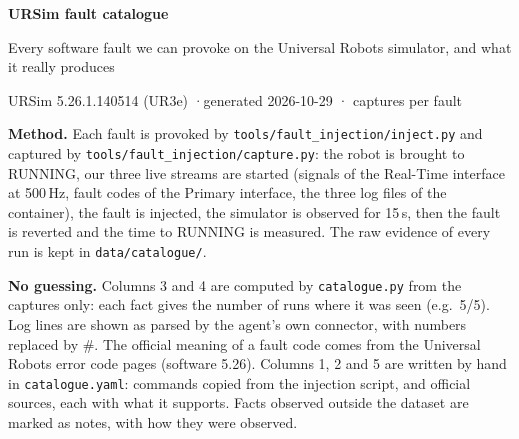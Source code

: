 \documentclass[10pt]{article}
\begin{document}
{\LARGE\bfseries\color{accent} URSim fault catalogue}\par
\vspace{2pt}
{\large Every software fault we can provoke on the Universal Robots simulator, and what it really produces}\par
\vspace{4pt}
URSim 5.26.1.140514 (UR3e) \quad·\quad generated 2026-10-29 \quad· captures per fault

\vspace{6pt}
\textbf{Method.} Each fault is provoked by \texttt{tools/fault\_injection/inject.py} and captured by
\texttt{tools/fault\_injection/capture.py}: the robot is brought to RUNNING, our three live streams are started
(signals of the Real-Time interface at 500\,Hz, fault codes of the Primary interface, the three log files of the
container), the fault is injected, the simulator is observed for 15\,s, then the fault is reverted and the time to
RUNNING is measured. The raw evidence of every run is kept in \texttt{data/catalogue/}.

\textbf{No guessing.} Columns 3 and 4 are computed by \texttt{catalogue.py} from the captures only: each fact
gives the number of runs where it was seen (e.g.\ 5/5). Log lines are shown as parsed by the agent's own
connector, with numbers replaced by \#. The official meaning of a fault code comes from the Universal Robots error
code pages (software 5.26). Columns 1, 2 and 5 are written by hand in \texttt{catalogue.yaml}: commands copied
from the injection script, and official sources, each with what it supports. Facts observed outside the dataset are
marked as notes, with how they were observed.
\end{document}
